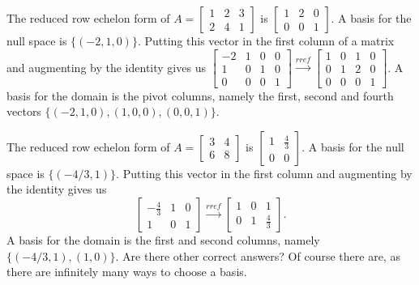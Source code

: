 \begin{example}
The reduced row echelon form of 
$A=
\begin{bmatrix}
 1 & 2 & 3 \\
 2 & 4 & 1
\end{bmatrix}
$
is
$
\begin{bmatrix}
 1 & 2 & 0 \\
 0 & 0 & 1
\end{bmatrix}
$.  A basis for the null space is $\{(-2,1,0)\}$. 
Putting this vector in the first column of a matrix and augmenting by the identity gives us 
$
\begin{bmatrix}
 -2 & 1 & 0 & 0 \\
 1 & 0 & 1 & 0 \\
 0 & 0 & 0 & 1\end{bmatrix}
\xrightarrow{rref}
\begin{bmatrix}
 1 & 0 & 1 & 0 \\
 0 & 1 & 2 & 0 \\
 0 & 0 & 0 & 1
\end{bmatrix}
$.
A basis for the domain is the pivot columns, namely the first, second and fourth vectors $\{(-2,1,0),(1,0,0), (0,0,1)\}$. 

\end{example}


\begin{example}
The reduced row echelon form of 
$A=
\begin{bmatrix}
 3 & 4 \\
 6 & 8
\end{bmatrix}
$
is
$
\begin{bmatrix}
 1 & \frac{4}{3} \\
 0 & 0
\end{bmatrix}
$.  A basis for the null space is $\{(-4/3,1)\}$. Putting this vector in the first column and augmenting by the identity gives us 
$$
\begin{bmatrix}
 -\frac{4}{3} & 1 & 0 \\
 1 & 0 & 1
\end{bmatrix}
\xrightarrow{rref}
\begin{bmatrix}
 1 & 0 & 1 \\
 0 & 1 & \frac{4}{3}
\end{bmatrix}
.$$
A basis for the domain is the first and second columns, namely $\{(-4/3,1),(1,0)\}$. Are there other correct answers? Of course there are, as there are infinitely many ways to choose a basis.

\end{example}

